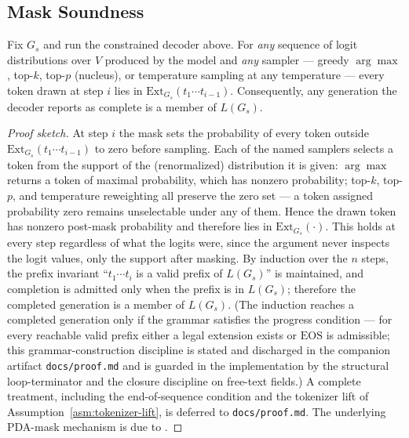 \subsection{Mask Soundness}
\label{sub:formal-lemma}

\begin{lemma}
\label{lem:mask-soundness}
Fix \(G_s\) and run the constrained decoder above. For \emph{any} sequence of logit distributions over \(V\) produced by the model and \emph{any} sampler --- greedy \(\arg\max\), top-\(k\), top-\(p\) (nucleus), or temperature sampling at any temperature --- every token drawn at step \(i\) lies in \(\mathrm{Ext}_{G_s}(t_1 \cdots t_{i-1})\). Consequently, any generation the decoder reports as complete is a member of \(L(G_s)\).
\end{lemma}

\begin{proof}[Proof sketch]
At step \(i\) the mask sets the probability of every token outside \(\mathrm{Ext}_{G_s}(t_1 \cdots t_{i-1})\) to zero before sampling. Each of the named samplers selects a token from the support of the (renormalized) distribution it is given: \(\arg\max\) returns a token of maximal probability, which has nonzero probability; top-\(k\), top-\(p\), and temperature reweighting all preserve the zero set --- a token assigned probability zero remains unselectable under any of them. Hence the drawn token has nonzero post-mask probability and therefore lies in \(\mathrm{Ext}_{G_s}(\cdot)\). This holds at every step regardless of what the logits were, since the argument never inspects the logit values, only the support after masking. By induction over the \(n\) steps, the prefix invariant ``\(t_1 \cdots t_i\) is a valid prefix of \(L(G_s)\)'' is maintained, and completion is admitted only when the prefix is in \(L(G_s)\); therefore the completed generation is a member of \(L(G_s)\). (The induction reaches a completed generation only if the grammar satisfies the progress condition --- for every reachable valid prefix either a legal extension exists or \(\mathrm{EOS}\) is admissible; this grammar-construction discipline is stated and discharged in the companion artifact \texttt{docs/proof.md} and is guarded in the implementation by the structural loop-terminator and the closure discipline on free-text fields.) A complete treatment, including the end-of-sequence condition and the tokenizer lift of Assumption~\ref{asm:tokenizer-lift}, is deferred to \texttt{docs/proof.md}. The underlying PDA-mask mechanism is due to \cite{willard2023,dong2024xgrammar}.
\end{proof}

